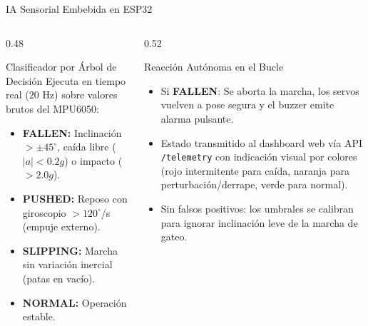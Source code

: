 \documentclass[10pt, aspectratio=169]{beamer}
\begin{document}
\begin{frame}{IA Sensorial Embebida en ESP32}
    \begin{columns}
        \begin{column}{0.48\textwidth}
            \begin{block}{Clasificador por Árbol de Decisión}
                Ejecuta en tiempo real ($20\text{ Hz}$) sobre valores brutos del MPU6050:
                \begin{itemize}
                    \item \textbf{FALLEN:} Inclinación $> \pm 45^\circ$, caída libre ($|a| < 0.2g$) o impacto ($> 2.0g$).
                    \item \textbf{PUSHED:} Reposo con giroscopio $> 120^\circ$/s (empuje externo).
                    \item \textbf{SLIPPING:} Marcha sin variación inercial (patas en vacío).
                    \item \textbf{NORMAL:} Operación estable.
                \end{itemize}
            \end{block}
        \end{column}
        \begin{column}{0.52\textwidth}
            \begin{alertblock}{Reacción Autónoma en el Bucle}
                \begin{itemize}
                    \item Si \textbf{FALLEN}: Se aborta la marcha, los servos vuelven a pose segura y el buzzer emite alarma pulsante.
                    \item Estado transmitido al dashboard web vía API \texttt{/telemetry} con indicación visual por colores (rojo intermitente para caída, naranja para perturbación/derrape, verde para normal).
                    \item Sin falsos positivos: los umbrales se calibran para ignorar inclinación leve de la marcha de gateo.
                \end{itemize}
            \end{alertblock}
        \end{column}
    \end{columns}
\end{frame}
\end{document}
